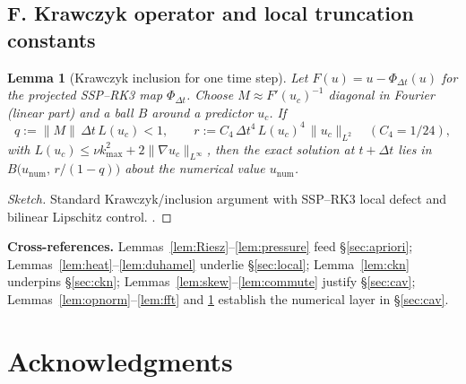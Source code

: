 \IfFileExists{nyjm.cls}{\documentclass[11pt]{nyjm}}{\documentclass[11pt]{amsart}}
\theoremstyle{plain}
\newtheorem{lemma}[theorem]{Lemma}
\theoremstyle{definition}
\theoremstyle{remark}
\begin{document}
\subsection*{F. Krawczyk operator and local truncation constants}\label{app:krawczyk}
\begin{lemma}[Krawczyk inclusion for one time step]\label{lem:krawczyk}
Let $F(u)=u-\Phi_{\Delta t}(u)$ for the projected SSP–RK3 map $\Phi_{\Delta t}$. Choose $M\approx F'(u_c)^{-1}$ diagonal in Fourier (linear part) and a ball $B$ around a predictor $u_c$. If
\[
q:=\|M\|\,\Delta t\,L(u_c)<1,\qquad
r:= C_4\,\Delta t^4\,L(u_c)^4\,\|u_c\|_{L^2}\quad (C_4=1/24),
\]
with $L(u_c)\le \nu k_{\max}^2+2\|\nabla u_c\|_{L^\infty}$, then the exact solution at $t+\Delta t$ lies in $B\big(u_{\mathrm{num}},\, r/(1-q)\big)$ about the numerical value $u_{\mathrm{num}}$.
\end{lemma}
\begin{proof}[Sketch]
Standard Krawczyk/inclusion argument with SSP–RK3 local defect and bilinear Lipschitz control. \cite{Neumaier1990,Rump1999,Tucker2011,ButcherBook}.
\end{proof}

\medskip
\noindent\textbf{Cross-references.}
Lemmas~\ref{lem:Riesz}–\ref{lem:pressure} feed \S\ref{sec:apriori};
Lemmas~\ref{lem:heat}–\ref{lem:duhamel} underlie \S\ref{sec:local};
Lemma~\ref{lem:ckn} underpins \S\ref{sec:ckn};
Lemmas~\ref{lem:skew}–\ref{lem:commute} justify \S\ref{sec:cav};
Lemmas~\ref{lem:opnorm}–\ref{lem:fft} and \ref{lem:krawczyk} establish the numerical layer in \S\ref{sec:cav}.




\section*{Acknowledgments}

\end{document}
